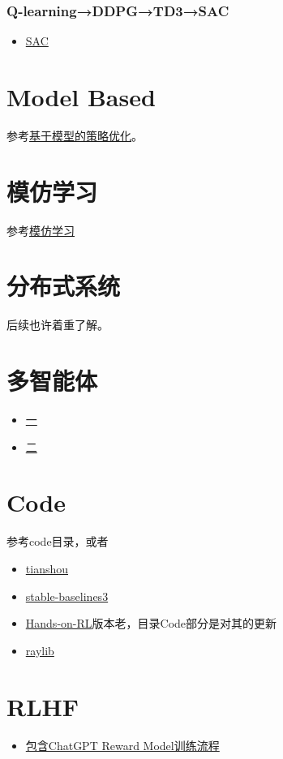 \documentclass[UTF8]{ctexart}
\begin{document}
\subsubsection{Q-learning→DDPG→TD3→SAC}
\begin{itemize}
    \item \href{https://hrl.boyuai.com/chapter/2/sac%E7%AE%97%E6%B3%95}{SAC}
\end{itemize}

\section{Model Based}
参考\href{https://hrl.boyuai.com/chapter/3/%E5%9F%BA%E4%BA%8E%E6%A8%A1%E5%9E%8B%E7%9A%84%E7%AD%96%E7%95%A5%E4%BC%98%E5%8C%96}{基于模型的策略优化}。


\section{模仿学习}
参考\href{https://hrl.boyuai.com/chapter/3/%E6%A8%A1%E4%BB%BF%E5%AD%A6%E4%B9%A0}{模仿学习}

\section{分布式系统}
后续也许着重了解。

\section{多智能体}
\begin{itemize}
    \item \href{https://hrl.boyuai.com/chapter/3/%E5%A4%9A%E6%99%BA%E8%83%BD%E4%BD%93%E5%BC%BA%E5%8C%96%E5%AD%A6%E4%B9%A0%E5%85%A5%E9%97%A8}{一}
    \item \href{https://hrl.boyuai.com/chapter/3/%E5%A4%9A%E6%99%BA%E8%83%BD%E4%BD%93%E5%BC%BA%E5%8C%96%E5%AD%A6%E4%B9%A0%E8%BF%9B%E9%98%B6}{二}
\end{itemize}

\section{Code}
参考code目录，或者
\begin{itemize}
    \item \href{https://github.com/thu-ml/tianshou}{tianshou}
    \item \href{https://github.com/DLR-RM/stable-baselines3}{stable-baselines3}
    \item \href{https://github.com/boyu-ai/Hands-on-RL}{Hands-on-RL}版本老，目录Code部分是对其的更新
    \item \href{https://www.raylib.com/}{raylib}
\end{itemize}

\section{RLHF}
\begin{itemize}
    \item \href{https://github.com/HarderThenHarder/transformers_tasks/tree/main/RLHF}{包含ChatGPT Reward Model训练流程}
\end{itemize}
\end{document}
